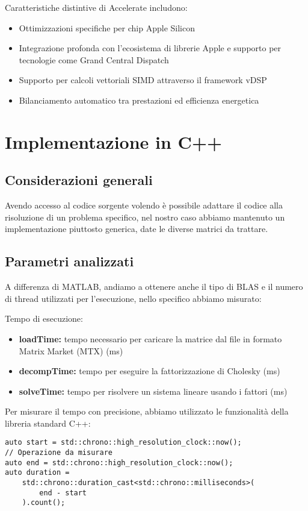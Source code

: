 Caratteristiche distintive di Accelerate includono:

\begin{itemize}
    \item Ottimizzazioni specifiche per chip Apple Silicon
    \item Integrazione profonda con l'ecosistema di librerie Apple e supporto per tecnologie come Grand Central Dispatch
    \item Supporto per calcoli vettoriali SIMD attraverso il framework vDSP
    \item Bilanciamento automatico tra prestazioni ed efficienza energetica
\end{itemize}

\section{Implementazione in C++}

\subsection{Considerazioni generali} 

Avendo accesso al codice sorgente volendo è possibile adattare il codice alla risoluzione di un problema specifico,
nel nostro caso abbiamo mantenuto un implementazione piuttosto generica, date le diverse matrici da trattare.

\subsection{Parametri analizzati} 

A differenza di MATLAB, andiamo a ottenere anche il tipo di BLAS e il numero di thread utilizzati per l'esecuzione,
nello specifico abbiamo misurato:

Tempo di esecuzione:
\begin{itemize}
    \item \textbf{loadTime:} tempo necessario per caricare la matrice dal file in formato Matrix Market (MTX) (\unit{\milli\second})
    \item \textbf{decompTime:} tempo per eseguire la fattorizzazione di Cholesky (\unit{\milli\second})
    \item \textbf{solveTime:} tempo per risolvere un sistema lineare usando i fattori (\unit{\milli\second})
\end{itemize}

Per misurare il tempo con precisione, abbiamo utilizzato le funzionalità della libreria standard C++:
\begin{verbatim}
auto start = std::chrono::high_resolution_clock::now();
// Operazione da misurare
auto end = std::chrono::high_resolution_clock::now();
auto duration =
    std::chrono::duration_cast<std::chrono::milliseconds>(
        end - start
    ).count();
\end{verbatim}

